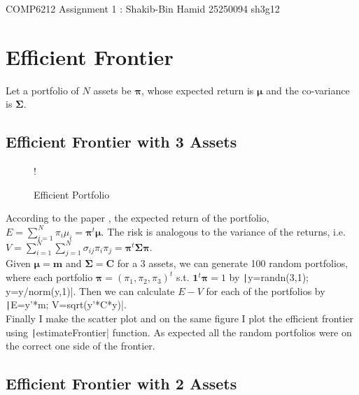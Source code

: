 \documentclass[11pt]{article}
\begin{document}
\begin{center}

\Large{COMP6212 Assignment 1 : Shakib-Bin Hamid 25250094 sh3g12}

\end{center}

\section{Efficient Frontier}

Let a portfolio of $N$ assets be $\bm{\pi}$, whose expected return is $\bm{\mu}$ and the 
co-variance is $\bm{\Sigma}$. \\

\subsection{Efficient Frontier with 3 Assets}

\begin{figure}
	\vspace{-2cm}
  \begin{center}
     {!} { }
	\caption{Efficient Portfolio}
	\label{fig:q1-a-efficient-portfolio}
  \end{center}
	\vspace{-1cm}
\end{figure}

According to the paper \cite{markowitz}, the expected return of the portfolio, 
$E = \sum_{i=1}^N\pi_i\mu_i = \bm{\pi}^t\bm{\mu}$. The risk is analogous to the variance of
the returns, i.e. $V = \sum_{i=1}^N\sum_{j=1}^N\sigma_{ij}\pi_i\pi_j = \bm{\pi}^t\bm{\Sigma}\bm{\pi}$.\\

Given $\bm{\mu} = \bm{m}$ and $\bm{\Sigma} = \bm{C}$ for a $3$ assets, we can generate 100 random
portfolios, where each portfolio $\bm{\pi} = (\pi_1, \pi_2, \pi_3)^t$ s.t. $\bm{1}^t\bm{\pi} = 1$ by
\texttt|y=randn(3,1); y=y/norm(y,1)|. Then we can calculate $E-V$ for each of the portfolios by
\texttt|E=y'*m; V=sqrt(y'*C*y)|.\\

Finally I make the scatter plot and on the same figure I plot the efficient frontier using
\texttt|estimateFrontier| function. As expected all the random portfolios were on the
correct one side of the frontier. 

\subsection{Efficient Frontier with 2 Assets}
\end{document}

